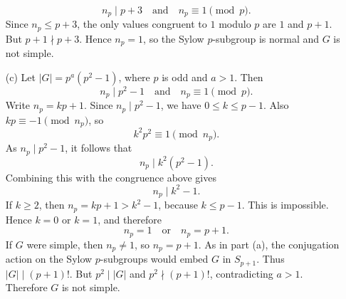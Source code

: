 \documentclass[../Odyssey_Project.tex]{subfiles}
\begin{document}
\begin{solution}
\begin{enumerate}
        \[
            n_p\mid p+3
            \quad\text{and}\quad
            n_p\equiv 1\pmod p.
        \]
        Since $n_p\leq p+3$, the only values congruent to $1$ modulo $p$ are $1$ and $p+1$. But $p+1\nmid p+3$. Hence $n_p=1$, so the Sylow $p$-subgroup is normal and $G$ is not simple.
        \item[(c)] Let $|G|=p^a(p^2-1)$, where $p$ is odd and $a>1$. Then
        \[
            n_p\mid p^2-1
            \quad\text{and}\quad
            n_p\equiv 1\pmod p.
        \]
        Write $n_p=kp+1$. Since $n_p\mid p^2-1$, we have $0\leq k\leq p-1$. Also $kp\equiv -1\pmod{n_p}$, so
        \[
            k^2p^2\equiv 1\pmod{n_p}.
        \]
        As $n_p\mid p^2-1$, it follows that
        \[
            n_p\mid k^2(p^2-1).
        \]
        Combining this with the congruence above gives
        \[
            n_p\mid k^2-1.
        \]
        If $k\geq 2$, then $n_p=kp+1>k^2-1$, because $k\leq p-1$. This is impossible. Hence $k=0$ or $k=1$, and therefore
        \[
            n_p=1
            \quad\text{or}\quad
            n_p=p+1.
        \]
        If $G$ were simple, then $n_p\neq 1$, so $n_p=p+1$. As in part (a), the conjugation action on the Sylow $p$-subgroups would embed $G$ in $S_{p+1}$. Thus $|G|\mid (p+1)!$. But $p^2\mid |G|$ and $p^2\nmid (p+1)!$, contradicting $a>1$. Therefore $G$ is not simple.
    \end{enumerate}
\end{solution}
\end{document}
